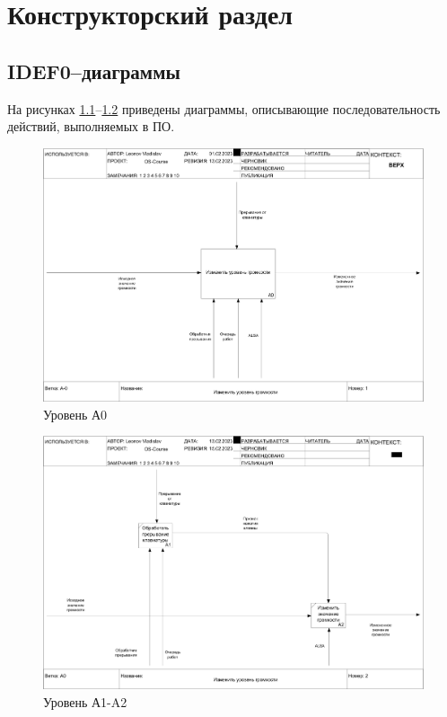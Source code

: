 \chapter{Конструкторский раздел}

\section{IDEF0--диаграммы}
На рисунках \ref{fig:idef0-1}--\ref{fig:idef0-2} приведены диаграммы, описывающие последовательность действий, выполняемых в ПО.

\begin{figure}[h!btp]
	\centering
	\includegraphics[scale = 0.35]{inc/img/01_A-0.png}
	\caption{Уровень А0}
	\label{fig:idef0-1}	
\end{figure}

\clearpage

\begin{figure}[h!btp]
	\centering
	\includegraphics[scale = 0.35]{inc/img/02_A0.png}
	\caption{Уровень А1-A2}
	\label{fig:idef0-2}	
\end{figure}

